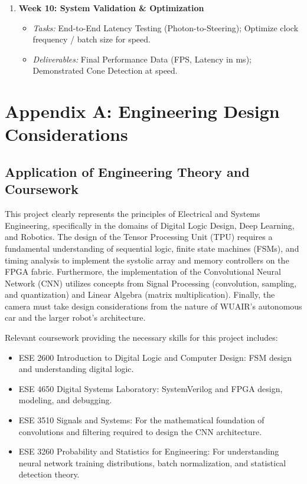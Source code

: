 \documentclass[11pt,a4paper,twoside]{article}
\begin{document}
\begin{enumerate}
    \item \textbf{Week 10: System Validation \& Optimization}
    \begin{itemize}
        \item \textit{Tasks:} End-to-End Latency Testing (Photon-to-Steering); Optimize clock frequency / batch size for speed.
        \item \textit{Deliverables:} Final Performance Data (FPS, Latency in ms); Demonstrated Cone Detection at speed.
    \end{itemize}
\end{enumerate}


\section{Appendix A: Engineering Design Considerations}
\subsection{Application of Engineering Theory and Coursework} 

This project clearly represents the principles of Electrical and Systems Engineering, specifically in the domains of Digital Logic Design, Deep Learning, and Robotics. The design of the Tensor Processing Unit (TPU) requires a fundamental understanding of sequential logic, finite state machines (FSMs), and timing analysis to implement the systolic array and memory controllers on the FPGA fabric. Furthermore, the implementation of the Convolutional Neural Network (CNN) utilizes concepts from Signal Processing (convolution, sampling, and quantization) and Linear Algebra (matrix multiplication). Finally, the camera must take design considerations from the nature of WUAIR's autonomous car and the larger robot's architecture.

Relevant coursework providing the necessary skills for this project includes: 
\begin{itemize} 
    \item ESE 2600 Introduction to Digital Logic and Computer Design: FSM design and understanding digital logic. 
    \item ESE 4650 Digital Systems Laboratory: SystemVerilog and FPGA design, modeling, and debugging.
    \item ESE 3510 Signals and Systems: For the mathematical foundation of convolutions and filtering required to design the CNN architecture. 
    \item ESE 3260 Probability and Statistics for Engineering: For understanding neural network training distributions, batch normalization, and statistical detection theory. 
\end{itemize}
\end{document}
